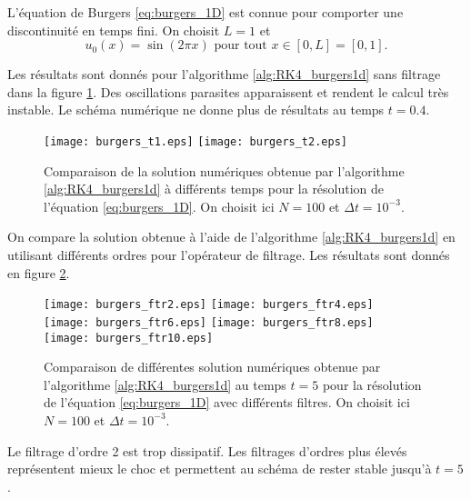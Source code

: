 L'équation de Burgers \eqref{eq:burgers_1D} est connue pour comporter une discontinuité en temps fini. On choisit $L=1$ et
\begin{equation}
u_0(x) = \sin ( 2 \pi x) \text{ pour tout } x \in [0,L]=[0,1].
\end{equation}

Les résultats sont donnés pour l'algorithme \ref{alg:RK4_burgers1d} sans filtrage dans la figure \ref{fig:comp_burgers}. Des oscillations parasites apparaissent et rendent le calcul très instable. Le schéma numérique ne donne plus de résultats au temps $t=0.4$.
\begin{figure}[htbp]
\begin{center}
\texttt{[image: burgers\_t1.eps]}
\texttt{[image: burgers\_t2.eps]}
\end{center}
\caption{Comparaison de la solution numériques obtenue par l'algorithme \ref{alg:RK4_burgers1d} à différents temps pour la résolution de l'équation \eqref{eq:burgers_1D}. On choisit ici $N=100$ et $\Delta t = 10^{-3}$.}
\label{fig:comp_burgers}
\end{figure}
On compare la solution obtenue à l'aide de l'algorithme \ref{alg:RK4_burgers1d} en utilisant différents ordres pour l'opérateur de filtrage. Les résultats sont donnés en figure \ref{fig:comp_burgers_ftr}.
\begin{figure}[htbp]
\begin{center}
\texttt{[image: burgers\_ftr2.eps]}
\texttt{[image: burgers\_ftr4.eps]}\\
\texttt{[image: burgers\_ftr6.eps]}
\texttt{[image: burgers\_ftr8.eps]}\\
\texttt{[image: burgers\_ftr10.eps]}
\end{center}
\caption{Comparaison de différentes solution numériques obtenue par l'algorithme \ref{alg:RK4_burgers1d} au temps $t=5$ pour la résolution de l'équation \eqref{eq:burgers_1D} avec différents filtres. On choisit ici $N=100$ et $\Delta t = 10^{-3}$.}
\label{fig:comp_burgers_ftr}
\end{figure}
Le filtrage d'ordre 2 est trop dissipatif. Les filtrages d'ordres plus élevés représentent mieux le choc et permettent au schéma de rester stable jusqu'à $t=5$.
















